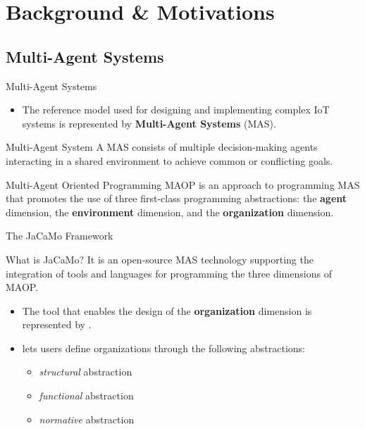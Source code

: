 \section{Background \& Motivations}

\subsection{Multi-Agent Systems}
\begin{frame}{Multi-Agent Systems}
    \begin{itemize}
        \item The reference model used for designing and implementing complex IoT systems is represented by \textbf{Multi-Agent Systems} (MAS).
    \end{itemize}

    \vspace{0.5cm}

    \begin{block}{Multi-Agent System}
        A MAS consists of multiple decision-making agents interacting in a shared environment to achieve common or conflicting goals.~\cite{turing}
    \end{block}

    \begin{block}{Multi-Agent Oriented Programming}
        MAOP is an approach to programming MAS that promotes the use of three first-class programming abstractions: the \textbf{agent} dimension, the \textbf{environment} dimension, and the \textbf{organization} dimension.~\cite{boissier2020multi}
    \end{block}
\end{frame}

\begin{frame}{The JaCaMo Framework}
    \begin{block}{What is JaCaMo?}
        It is an open-source MAS technology supporting the integration of tools and languages for programming the three dimensions of MAOP.~\cite{boissier2020multi}
    \end{block}

    \vspace{0.5cm}

    \begin{itemize}
        \item The tool that enables the design of the \textbf{organization} dimension is represented by \moise{}.
        \item \moise{} lets users define organizations through the following abstractions:
        \begin{itemize}
            \item \emph{structural} abstraction
            \item \emph{functional} abstraction
            \item \emph{normative} abstraction
        \end{itemize}
    \end{itemize}
\end{frame}

